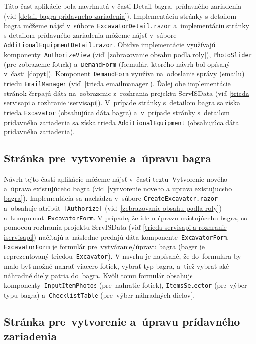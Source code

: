 Táto časť aplikácie bola navrhnutá v časti Detail bagra, prídavného zariadenia (viď \ref{detail bagra pridavneho zariadenia}). Implementáciu stránky s detailom bagra môžeme nájsť v~súbore~\verb|ExcavatorDetail.razor| a~implementáciu stránky s detailom prídavného zariadenia môžeme nájsť v~súbore \verb|AdditionalEquipmentDetail.razor|. Obidve implementácie využívajú komponenty~\verb|AuthorizeView| (viď~\ref{zobrazovanie obsahu podla roly}), \verb|PhotoSlider| (pre zobrazenie fotiek) a~\verb|DemandForm| (formulár, ktorého návrh bol opísaný v~časti \ref{dopyt}). Komponent~\verb|DemandForm| využíva na~odoslanie správy (emailu) triedu \verb|EmailManager| (viď~\ref{trieda emailmanager}). Ďalej obe implementácie stránok čerpajú dáta na~zobrazenie z~rozhrania projektu ServISData (viď \ref{trieda servisapi a rozhranie iservisapi}). V~prípade stránky s~detailom bagra sa získa trieda \verb|Excavator| (obsahujúca dáta bagra) a~v~prípade stránky s~detailom prídavného zariadenia sa získa trieda \verb|AdditionalEquipment| (obsahujúca dáta prídavného zariadenia).

\subsection{Stránka pre~vytvorenie a~úpravu bagra}
\label{stranka pre vytvorenie a upravu bagra}

Návrh tejto časti aplikácie môžeme nájsť v~časti textu~Vytvorenie nového a~úprava existujúceho bagra (viď~\ref{vytvorenie noveho a uprava existujuceho bagra}). Implementácia sa nachádza v~súbore \verb|CreateExcavator.razor| a~obsahuje atribút~\verb|[Authorize]| (viď~\ref{zobrazovanie obsahu podla roly}) a~komponent~\verb|ExcavatorForm|. V prípade, že ide o úpravu existujúceho bagra, sa pomocou rozhrania projektu ServISData (viď \ref{trieda servisapi a rozhranie iservisapi}) načítajú a~následne predajú dáta komponente~\verb|ExcavatorForm|. \verb|ExcavatorForm| je formulár pre~vytváranie/úpravu bagra (bager je reprezentovaný triedou~\verb|Excavator|). V návrhu je napísané, že do~formulára by malo byť možné nahrať viacero fotiek, vybrať typ bagra, a~tiež vybrať aké náhradné diely patria do~bagra. Kvôli tomu formulár obsahuje komponenty~\verb|InputItemPhotos| (pre~nahratie fotiek), \verb|ItemsSelector| (pre~výber typu bagra) a~\verb|ChecklistTable| (pre~výber náhradných dielov).

\subsection{Stránka pre~vytvorenie a~úpravu prídavného zariadenia}

